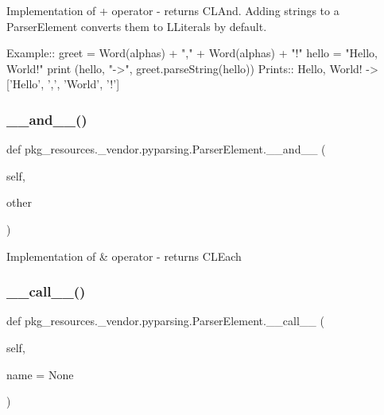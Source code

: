 \begin{DoxyVerb}Implementation of + operator - returns C{L{And}}. Adding strings to a ParserElement
converts them to L{Literal}s by default.

Example::
    greet = Word(alphas) + "," + Word(alphas) + "!"
    hello = "Hello, World!"
    print (hello, "->", greet.parseString(hello))
Prints::
    Hello, World! -> ['Hello', ',', 'World', '!']
\end{DoxyVerb}
 \mbox{\label{classpkg__resources_1_1__vendor_1_1pyparsing_1_1ParserElement_a3030cb7cad27886b0d8876c3b4e1c4a1}} 
\subsubsection{\texorpdfstring{\+\_\+\+\_\+and\+\_\+\+\_\+()}{\_\_and\_\_()}}
{\footnotesize\ttfamily def pkg\+\_\+resources.\+\_\+vendor.\+pyparsing.\+Parser\+Element.\+\_\+\+\_\+and\+\_\+\+\_\+ (\begin{DoxyParamCaption}\item[{}]{self,  }\item[{}]{other }\end{DoxyParamCaption})}

\begin{DoxyVerb}Implementation of & operator - returns C{L{Each}}
\end{DoxyVerb}
 \mbox{\label{classpkg__resources_1_1__vendor_1_1pyparsing_1_1ParserElement_a43d9a7e720d29a80c49f63998712c9a5}} 
\subsubsection{\texorpdfstring{\+\_\+\+\_\+call\+\_\+\+\_\+()}{\_\_call\_\_()}}
{\footnotesize\ttfamily def pkg\+\_\+resources.\+\_\+vendor.\+pyparsing.\+Parser\+Element.\+\_\+\+\_\+call\+\_\+\+\_\+ (\begin{DoxyParamCaption}\item[{}]{self,  }\item[{}]{name = {\ttfamily None} }\end{DoxyParamCaption})}

